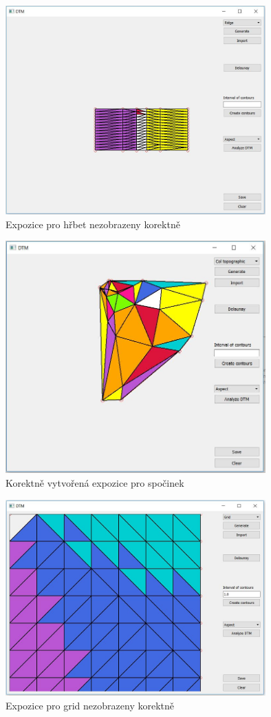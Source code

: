 \documentclass[a4paper, 12pt]{article}
\begin{document}
\begin{figure}[h!]
\centering
\includegraphics[width=10cm]{pictures/ridge_expozice.jpg}
\caption{Expozice pro hřbet nezobrazeny korektně}
\end{figure}

\begin{figure}[h!]
\centering
\includegraphics[width=10cm]{pictures/spocinek_expozice.jpg}
\caption{Korektně vytvořená expozice pro spočinek}
\end{figure}

\begin{figure}[h!]
\centering
\includegraphics[width=10cm]{pictures/grid_aspect.jpg}
\caption{Expozice pro grid nezobrazeny korektně}
\end{figure}
\end{document}
